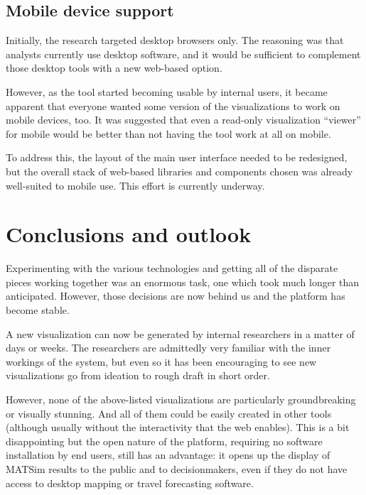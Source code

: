 \hypertarget{mathub-mobile-device-support}{%
\subsection{Mobile device support}\label{mobile-device-support}}

Initially, the research targeted desktop browsers only. The reasoning was that analysts currently use desktop software, and it would be sufficient to complement those desktop tools with a new web-based option.

However, as the tool started becoming usable by internal users, it became apparent that everyone wanted some version of the visualizations to work on mobile devices, too. It was suggested that even a read-only visualization ``viewer'' for mobile would be better than not having the tool work at all on mobile.

To address this, the layout of the main user interface needed to be redesigned, but the overall stack of web-based libraries and components chosen was already well-suited to mobile use. This effort is currently underway.

\hypertarget{mathub-conclusions-and-outlook}{%
\section{Conclusions and outlook}\label{conclusions-and-outlook}}

Experimenting with the various technologies and getting all of the disparate pieces working together was an enormous task, one which took much longer than anticipated. However, those decisions are now behind us and the platform has become stable.

A new visualization can now be generated by internal researchers in a matter of days or weeks. The researchers are admittedly very familiar with the inner workings of the system, but even so it has been encouraging to see new visualizations go from ideation to rough draft in short order.

However, none of the above-listed visualizations are particularly groundbreaking or visually stunning. And all of them could be easily created in other tools (although usually without the interactivity that the web enables). This is a bit disappointing but the open nature of the platform, requiring no software installation by end users, still has an advantage: it opens up the display of MATSim results to the public and to decisionmakers, even if they do not have access to desktop mapping or travel forecasting software.

